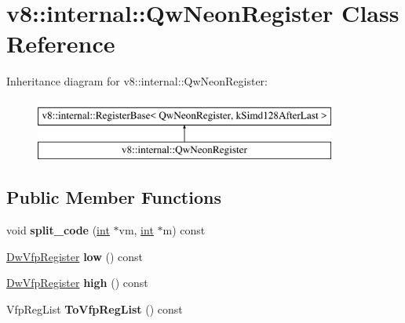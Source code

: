 \hypertarget{classv8_1_1internal_1_1QwNeonRegister}{}\section{v8\+:\+:internal\+:\+:Qw\+Neon\+Register Class Reference}
\label{classv8_1_1internal_1_1QwNeonRegister}
Inheritance diagram for v8\+:\+:internal\+:\+:Qw\+Neon\+Register\+:\begin{figure}[H]
\begin{center}
\leavevmode
\includegraphics[height=2.000000cm]{classv8_1_1internal_1_1QwNeonRegister}
\end{center}
\end{figure}
\subsection*{Public Member Functions}
\begin{DoxyCompactItemize}
\item 
\mbox{\label{classv8_1_1internal_1_1QwNeonRegister_a33f1e4d6f4cea81041f43df9a0931db8}} 
void {\bfseries split\+\_\+code} (\mbox{\hyperlink{classint}{int}} $\ast$vm, \mbox{\hyperlink{classint}{int}} $\ast$m) const
\item 
\mbox{\label{classv8_1_1internal_1_1QwNeonRegister_ab0ff8e5335c5e8f9335d5db50053b36f}} 
\mbox{\hyperlink{classv8_1_1internal_1_1DwVfpRegister}{Dw\+Vfp\+Register}} {\bfseries low} () const
\item 
\mbox{\label{classv8_1_1internal_1_1QwNeonRegister_af425e52b29bd261b047e86e753f2eb09}} 
\mbox{\hyperlink{classv8_1_1internal_1_1DwVfpRegister}{Dw\+Vfp\+Register}} {\bfseries high} () const
\item 
\mbox{\label{classv8_1_1internal_1_1QwNeonRegister_af38c20a2a4cce9d6429ef1e24e2320dc}} 
Vfp\+Reg\+List {\bfseries To\+Vfp\+Reg\+List} () const
\end{DoxyCompactItemize}
